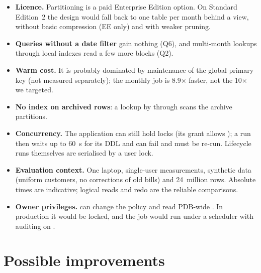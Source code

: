 \begin{itemize}
  \item \textbf{Licence.} Partitioning is a paid Enterprise Edition option. On Standard
        Edition~2 the design would fall back to one table per month behind a 
        view, without basic compression (EE only) and with weaker pruning.
  \item \textbf{Queries without a date filter} gain nothing (Q6), and multi-month lookups
        through local indexes read a few more blocks (Q2).
  \item \textbf{Warm cost.} It is probably dominated by maintenance of the global primary key (not measured separately); the
        monthly job is 8.9$\times$ faster, not the 10$\times$ we targeted.
  \item \textbf{No  index on archived rows}: a lookup by 
        through  scans the archive partitions.
  \item \textbf{Concurrency.} The application can still hold locks (its  grant
        allows ); a run then waits up to 60~s for its DDL and can fail and
        must be re-run. Lifecycle runs themselves are serialised by a user lock.
  \item \textbf{Evaluation context.} One laptop, single-user measurements, synthetic data
        (uniform customers, no corrections of old bills) and 24~million rows. Absolute times
        are indicative; logical reads and redo are the reliable comparisons.
  \item \textbf{Owner privileges.}  can change the policy and read
        PDB-wide . In production it would be locked, and the job would run under
        a scheduler with auditing on .
\end{itemize}

\section{Possible improvements}\label{sec:improvements}

